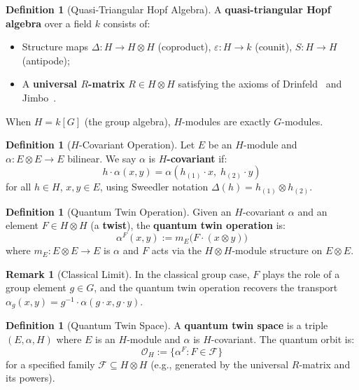 \documentclass[11pt,a4paper,openany]{book}
\theoremstyle{plain}
\theoremstyle{definition}
\newtheorem{definition}[theorem]{Definition}
\newtheorem{remark}[theorem]{Remark}
\newcommand{\opspace}{\mathcal{O}}
\newcommand{\actspace}{E}
\newcommand{\groupG}{G}
\begin{document}
\begin{definition}[Quasi-Triangular Hopf Algebra]\label{def:hopf}
A \textbf{quasi-triangular Hopf algebra} over a field $k$ consists of:
\begin{itemize}
    \item Structure maps $\Delta : H \to H \otimes H$ (coproduct), $\varepsilon : H \to k$ (counit), $S : H \to H$ (antipode);
    \item A \textbf{universal $R$-matrix} $R \in H \otimes H$ satisfying the axioms of Drinfeld~\cite{drinfeld1987} and Jimbo~\cite{jimbo1985}.
\end{itemize}
When $H = k[\groupG]$ (the group algebra), $H$-modules are exactly $\groupG$-modules.
\end{definition}

\begin{definition}[$H$-Covariant Operation]\label{def:H-covariant}
Let $\actspace$ be an $H$-module and $\alpha : \actspace \otimes \actspace \to \actspace$ bilinear. We say $\alpha$ is \textbf{$H$-covariant} if:
\[
h \cdot \alpha(x, y) = \alpha(h_{(1)} \cdot x, \;h_{(2)} \cdot y)
\]
for all $h \in H$, $x, y \in \actspace$, using Sweedler notation $\Delta(h) = h_{(1)} \otimes h_{(2)}$.
\end{definition}

\begin{definition}[Quantum Twin Operation]\label{def:quantum-twin}
Given an $H$-covariant $\alpha$ and an element $F \in H \otimes H$ (a \textbf{twist}), the \textbf{quantum twin operation} is:
\[
\alpha^F(x, y) := m_\actspace\big(F \cdot (x \otimes y)\big)
\]
where $m_\actspace : \actspace \otimes \actspace \to \actspace$ is $\alpha$ and $F$ acts via the $H \otimes H$-module structure on $\actspace \otimes \actspace$.
\end{definition}

\begin{remark}[Classical Limit]
In the classical group case, $F$ plays the role of a group element $g \in \groupG$, and the quantum twin operation recovers the transport $\alpha_g(x, y) = g^{-1} \cdot \alpha(g \cdot x, g \cdot y)$.
\end{remark}

\begin{definition}[Quantum Twin Space]\label{def:quantum-twin-space}
A \textbf{quantum twin space} is a triple $(\actspace, \alpha, H)$ where $\actspace$ is an $H$-module and $\alpha$ is $H$-covariant. The quantum orbit is:
\[
\opspace_H := \{\alpha^F : F \in \mathcal{F}\}
\]
for a specified family $\mathcal{F} \subseteq H \otimes H$ (e.g., generated by the universal $R$-matrix and its powers).
\end{definition}
\end{document}
